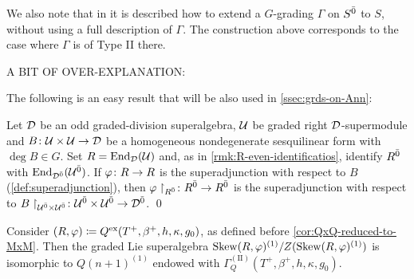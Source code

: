 
\begin{remark}
    We also note that in \cite[Theorem 5.1]{paper-Qn} it is described how to extend a $G$-grading $\Gamma$ on $S^{\bar0}$ to $S$, without using a full description of $\Gamma$. 
    The construction above corresponds to the case where $\Gamma$ is of Type II there. 
\end{remark}


    
    

A BIT OF OVER-EXPLANATION:

The following is an easy result that will be also used in \cref{ssec:grds-on-Ann}:

\begin{lemma}
    Let $\mathcal{D}$ be an odd graded-division superalgebra, $\mathcal U$ be graded right $\mathcal{D}$-supermodule and $B\colon \mathcal U \times \mathcal U \to \mathcal{D}$ be a homogeneous nondegenerate sesquilinear form with $\deg B \in G$. 
    Set $R = \operatorname{End}_{\mathcal{D}}(\mathcal U)$ and, as in \cref{rmk:R-even-identificatios}, identify $R^{\bar0}$ with $\operatorname{End}_{\mathcal{D}^{\bar0}} (\mathcal U^{\bar0})$. 
    If $\varphi\colon R \to R$ is the superadjunction with respect to $B$ (\cref{def:superadjunction}), then $\varphi\restriction_{R^{\bar0}}\colon R^{\bar0} \to R^{\bar0}$ is the superadjunction with respect to $B\restriction_{\mathcal U^{\bar0} \times \mathcal U^{\bar0}} \colon \mathcal U^{\bar0} \times \mathcal U^{\bar0} \to \mathcal{D}^{\bar0}$. \qed
\end{lemma}

\begin{prop}\label{prop:Q-Type-II-correspondence}
    Consider $(R, \varphi) \coloneqq Q^{\mathrm{ex}}(T^+, \beta^+, h, \kappa, g_0)$, as defined before \cref{cor:QxQ-reduced-to-MxM}. 
    Then the graded Lie superalgebra $\operatorname{Skew} (R,\varphi)^{(1)}/Z(\operatorname{Skew} (R,\varphi)^{(1)})$ is isomorphic to $Q(n+1)^{(1)}$ endowed with $\Gamma_Q^{\mathrm{(II)}}(T^+, \beta^+, h, \kappa, g_0)$. 
\end{prop}

